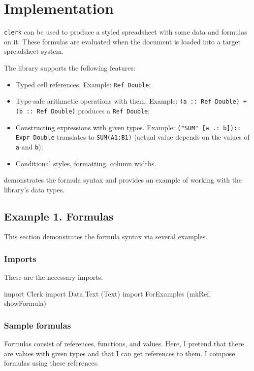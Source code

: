\chapter{Implementation}
\label{chap:impl}

\texttt{clerk} can be used to produce a styled spreadsheet with some data and formulas on it. These formulas are evaluated when the document is loaded into a target spreadsheet system.

The library supports the following features:

\begin{itemize}
  \item Typed cell references. Example: \texttt{Ref Double};
  \item Type-safe arithmetic operations with them. Example: \texttt{(a :: Ref Double) + (b :: Ref Double)} produces a \texttt{Ref Double};
 \item Constructing expressions with given types. Example: \texttt{("SUM" [a .: b]):: Expr Double} translates to \texttt{SUM(A1:B1)} (actual value depends on the values of \texttt{a} and \texttt{b});
  \item Conditional styles, formatting, column widths.
\end{itemize}

 demonstrates the formula syntax and  provides an example of working with the library's data types.

\section{Example 1. Formulas}
\label{sec:ex1}

This section demonstrates the formula syntax via several examples.

\subsection{Imports}

These are the necessary imports.

\begin{mycode}
import Clerk
import Data.Text (Text)
import ForExamples (mkRef, showFormula)
\end{mycode}

\subsection{Sample formulas}

Formulas consist of references, functions, and values.
Here, I pretend that there are values with given types and that I can get references to them. I compose formulas using these references.

